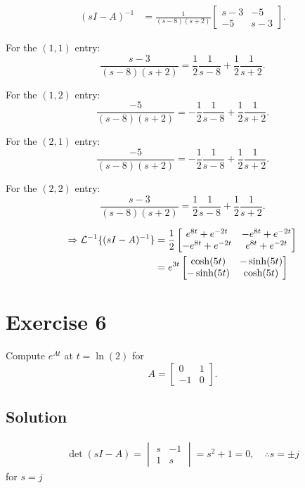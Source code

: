 \documentclass[12pt,a4paper]{article}
\begin{document}
\begin{align*}
    (sI-A)^{-1}
    &= \frac{1}{(s-8)(s+2)}
    \begin{bmatrix}
        s-3 & -5 \\ -5 & s-3
    \end{bmatrix}.
\end{align*}

For the $(1,1)$ entry:
\[
\frac{s-3}{(s-8)(s+2)}
=\frac{1}{2}\frac{1}{s-8}+\frac{1}{2}\frac{1}{s+2}.
\]

For the $(1,2)$ entry:
\[
\frac{-5}{(s-8)(s+2)}
=-\frac{1}{2}\frac{1}{s-8}+\frac{1}{2}\frac{1}{s+2}.
\]

For the $(2,1)$ entry:
\[
\frac{-5}{(s-8)(s+2)}
=-\frac{1}{2}\frac{1}{s-8}+\frac{1}{2}\frac{1}{s+2}.
\]

For the $(2,2)$ entry:
\[
\frac{s-3}{(s-8)(s+2)}
=\frac{1}{2}\frac{1}{s-8}+\frac{1}{2}\frac{1}{s+2}.
\]

\begin{align*}
\Rightarrow \mathcal{L}^{-1} \{(sI - A)^{-1}\} &= {1\over2} \begin{bmatrix}
		e^{8t} + e^{-2t} & -e^{8t} + e^{-2t} \\
	-e^{8t} + e^{-2t} & e^{8t} + e^{-2t}
\end{bmatrix}\\&= e^{3t} \begin{bmatrix}
\cosh(5t) & -\sinh(5t) \\
-\sinh(5t) & \cosh(5t)
\end{bmatrix}
\end{align*}
\vspace{3cm}


\needspace{11cm}
\section*{Exercise 6}
Compute $e^{At}$ at $t=\ln(2)$ for
\[
A=\begin{bmatrix}0&1\\-1&0\end{bmatrix}.
\]
\subsection*{Solution}
\begin{align*}
	\det (sI -A) = \begin{vmatrix}
		s & -1 \\ 1 & s
	\end{vmatrix} = s^2 + 1 = 0, \quad \therefore s = \pm j
\end{align*}
for $s = j$
\end{document}
